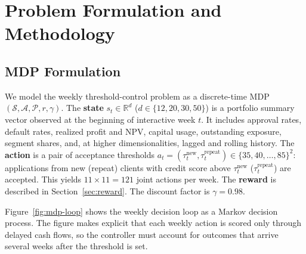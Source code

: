 \documentclass[preprint,review,authoryear,12pt]{elsarticle}
\begin{document}
\section{Problem Formulation and Methodology}

\subsection{MDP Formulation}

We model the weekly threshold-control problem as a discrete-time MDP
$(\mathcal{S}, \mathcal{A}, \mathcal{P}, r, \gamma)$. The \textbf{state}
$s_t \in \mathbb{R}^d$ ($d \in \{12, 20, 30, 50\}$) is a portfolio summary vector
observed at the beginning of interactive week $t$. It includes approval rates, default
rates, realized profit and NPV, capital usage, outstanding exposure, segment shares,
and, at higher dimensionalities, lagged and rolling history. The \textbf{action} is a
pair of acceptance thresholds
$a_t = (\tau^{\text{new}}_t, \tau^{\text{repeat}}_t) \in \{35, 40, \ldots, 85\}^2$:
applications from new (repeat) clients with credit score above $\tau^{\text{new}}_t$
($\tau^{\text{repeat}}_t$) are accepted. This yields $11 \times 11 = 121$ joint actions
per week. The \textbf{reward} is described in Section~\ref{sec:reward}. The discount
factor is $\gamma = 0.98$.

Figure~\ref{fig:mdp-loop} shows the weekly decision loop as a Markov decision process.
The figure makes explicit that each weekly action is scored only through delayed cash
flows, so the controller must account for outcomes that arrive several weeks after the
threshold is set.
\end{document}
